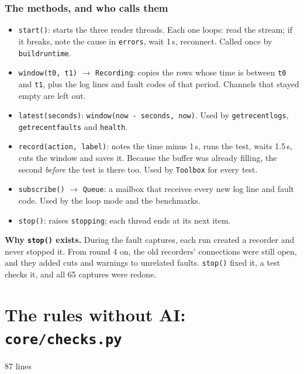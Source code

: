 \documentclass[10pt]{article}
\newcommand{\brkus}{\textunderscore\allowbreak}
\newcommand{\f}[1]{\texttt{\let\_\brkus #1}}
\newcommand{\filehead}[2]{\par\smallskip\noindent{\bfseries\ttfamily #1}\hfill{\small\color{ink2}#2 lines}\par\nobreak}
\begin{document}
\subsubsection*{The methods, and who calls them}
\begin{itemize}
\item \f{start()}: starts the three reader threads. Each one loops: read the stream; if it
breaks, note the cause in \f{errors}, wait 1\,s, reconnect. Called once by \f{build\_runtime}.
\item \f{window(t0, t1)} \(\to\) \f{Recording}: copies the rows whose time is between \f{t0}
and \f{t1}, plus the log lines and fault codes of that period. Channels that stayed empty are
left out.
\item \f{latest(seconds)}: \f{window(now - seconds, now)}. Used by \f{get\_recent\_logs},
\f{get\_recent\_faults} and \f{health}.
\item \f{record(action, label)}: notes the time minus 1\,s, runs the test, waits 1.5\,s, cuts the
window and saves it. Because the buffer was already filling, the second \emph{before} the test
is there too. Used by \f{Toolbox} for every test.
\item \f{subscribe()} \(\to\) \f{Queue}: a mailbox that receives every new log line and fault code.
Used by the loop mode and the benchmarks.
\item \f{stop()}: raises \f{\_stopping}; each thread ends at its next item.
\end{itemize}

\begin{careful}
\textbf{Why \f{stop()} exists.} During the fault captures, each run created a recorder and never
stopped it. From round 4 on, the old recorders' connections were still open, and they added
cuts and warnings to unrelated faults. \f{stop()} fixed it, a test checks it, and all 65
captures were redone.
\end{careful}

\section{The rules without AI: \f{core/checks.py}}
\filehead{checks.py}{87}
\end{document}
